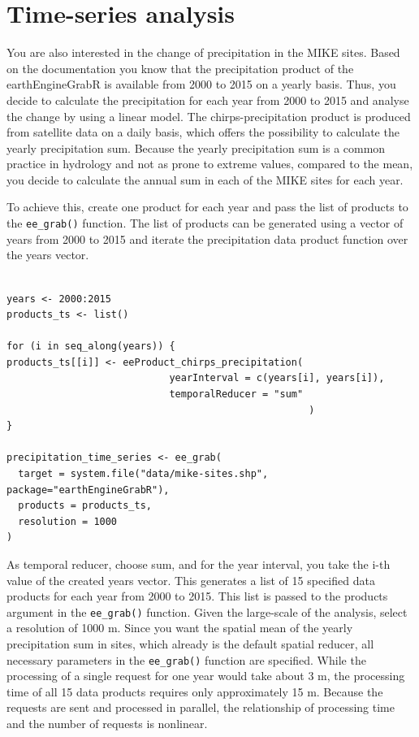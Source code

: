 \section{Time-series analysis}

You are also interested in the change of precipitation in the MIKE sites. Based on the documentation you know that the precipitation product of the earthEngineGrabR is available from 2000 to 2015 on a yearly basis. Thus, you decide to calculate the precipitation for each year from 2000 to 2015 and analyse the change by using a linear model. The chirps-precipitation product is produced from satellite data on a daily basis, which offers the possibility to calculate the yearly precipitation sum. Because the yearly precipitation sum is a common practice in hydrology and not as prone to extreme values, compared to the mean, you decide to calculate the annual sum in each of the MIKE sites for each year. 

To achieve this, create one product for each year and pass the list of products to the \texttt{ee\_grab()} function.
The list of products can be generated using a vector of years from 2000 to 2015 and iterate the precipitation data product function over the years vector.

\newpage

\begin{lstlisting}

years <- 2000:2015
products_ts <- list()

for (i in seq_along(years)) {
products_ts[[i]] <- eeProduct_chirps_precipitation(
							yearInterval = c(years[i], years[i]), 
							temporalReducer = "sum"
													)
}

precipitation_time_series <- ee_grab(
  target = system.file("data/mike-sites.shp", package="earthEngineGrabR"),
  products = products_ts,
  resolution = 1000
)
\end{lstlisting}


As temporal reducer, choose sum, and for the year interval, you take the i-th value of the created years vector. This generates a list of 15 specified data products for each year from 2000 to 2015. This list is passed to the products argument in the \texttt{ee\_grab()} function.
Given the large-scale of the analysis, select a resolution of 1000 m. Since you want the spatial mean of the yearly precipitation sum in sites, which already is the default spatial reducer, all necessary parameters in the \texttt{ee\_grab()} function are specified. While the processing of a single request for one year would take about 3 m, the processing time of all 15 data products requires only approximately 15 m. Because the requests are sent and processed in parallel, the relationship of processing time and the number of requests is nonlinear. 

